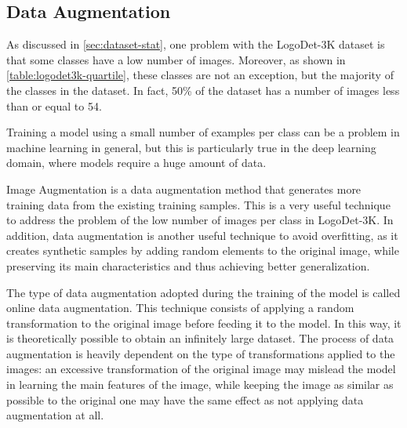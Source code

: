 \subsection{Data Augmentation}
\label{sec:methods-augment}
As discussed in \autoref{sec:dataset-stat}, one problem with the LogoDet-3K dataset is that some classes have a low number of images. Moreover, as shown in \autoref{table:logodet3k-quartile}, these classes are not an exception, but the majority of the classes in the dataset. In fact, 50\% of the dataset has a number of images less than or equal to 54.

Training a model using a small number of examples per class can be a problem in machine learning in general, but this is particularly true in the deep learning domain, where models require a huge amount of data.

Image Augmentation is a data augmentation method that generates more training data from the existing training samples. This is a very useful technique to address the problem of the low number of images per class in LogoDet-3K.
In addition, data augmentation is another useful technique to avoid overfitting, as it creates synthetic samples by adding random elements to the original image, while preserving its main characteristics and thus achieving better generalization.

The type of data augmentation adopted during the training of the model is called online data augmentation.
This technique consists of applying a random transformation to the original image before feeding it to the model.
In this way, it is theoretically possible to obtain an infinitely large dataset. The process of data augmentation is heavily dependent on the type of transformations applied to the images: an excessive transformation of the original image may mislead the model in learning the main features of the image, while keeping the image as similar as possible to the original one may have the same effect as not applying data augmentation at all.


